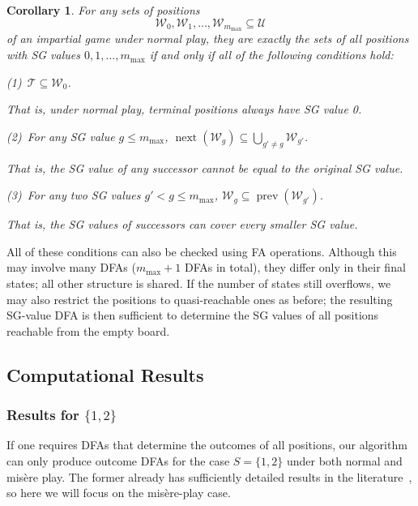 \documentclass[11pt]{article}
\newtheorem{corollary}{Corollary}[section]
\theoremstyle{definition}
\theoremstyle{plain}
\newcommand{\varU}{\mathcal{U}}
\newcommand{\varW}{\mathcal{W}}
\newcommand{\varT}{\mathcal{T}}
\newcommand{\nxt}{\operatorname{next}}
\newcommand{\prv}{\operatorname{prev}}
\begin{document}
\begin{corollary}\label{sg_cond}
    For any sets of positions
    \[
        \varW_{0}, \varW_{1}, \ldots, \varW_{m_{\max}}\subseteq \varU
    \]
    of an impartial game under normal play,
    they are exactly the sets of all positions with SG values $0, 1, \ldots, m_{\max}$ if and only if all of the following conditions hold:

    (1)~$\varT \subseteq \varW_{0}$.

    That is, under normal play, terminal positions always have SG value 0.

    (2)~For any SG value $g \leq m_{\max}$, $\nxt(\varW_{g}) \subseteq \bigcup_{g'\neq g} \varW_{g'}$.

    That is, the SG value of any successor cannot be equal to the original SG value.

    (3)~For any two SG values $g'<g \leq m_{\max}$, $\varW_{g} \subseteq \prv(\varW_{g'})$.

    That is, the SG values of successors can cover every smaller SG value.
\end{corollary}

All of these conditions can also be checked using FA operations.
Although this may involve many DFAs ($m_{\max}+1$ DFAs in total), they differ only in their final states; all other structure is shared.
If the number of states still overflows, we may also restrict the positions to quasi-reachable ones as before; the resulting SG-value DFA is then sufficient to determine the SG values of all positions reachable from the empty board.

\subsection{Computational Results}

\subsubsection{Results for $\{1, 2\}$}

If one requires DFAs that determine the outcomes of all positions, our algorithm can only produce outcome DFAs for the case $S=\{1,2\}$ under both normal and misère play.
The former already has sufficiently detailed results in the literature~\cite{Kotzig1995, Kotzig2019}, so here we will focus on the misère-play case.
\end{document}
